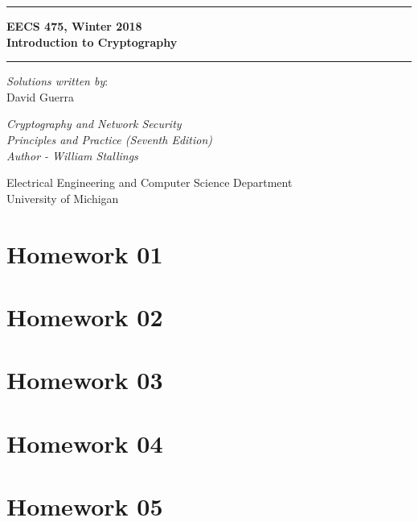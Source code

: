 \documentclass[answers]{exam}  %
\begin{document}
	\begin{titlepage}
		\begin{center}
			\vspace*{4cm}

			\hrule
			\vspace{0.5cm}
			{ 
				\LARGE 
				\textbf{EECS 475, Winter 2018}\\
				\textbf{Introduction to Cryptography}
			}
			\vspace{0.5cm}
			\hrule

			\vspace{2cm}

			\textit{Solutions written by}:\\
			{\large David Guerra}

			\vfill

			{ \Large \textit{Cryptography and Network Security}\\ }
			{ \Large \textit{Principles and Practice (Seventh Edition)}\\ }
			{ \Large \textit{Author - William Stallings} }

			\vspace{2cm}

			\Large
			Electrical Engineering and Computer Science Department\\
			University of Michigan

		\end{center}
	\end{titlepage}
	\newpage

	\tableofcontents
	\newpage

	\section{Homework 01}
	
	\newpage

	\section{Homework 02}
	
	\newpage

	\section{Homework 03}
	
	\newpage

	\section{Homework 04}
	
	\newpage

	\section{Homework 05}
	
	\newpage


\end{document}
